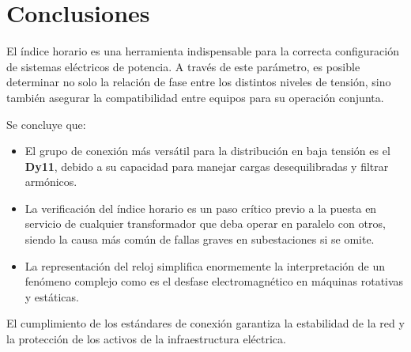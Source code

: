 \chapter{Conclusiones}

El índice horario es una herramienta indispensable para la correcta configuración 
de sistemas eléctricos de potencia. A través de este parámetro, es posible 
determinar no solo la relación de fase entre los distintos niveles de tensión, 
sino también asegurar la compatibilidad entre equipos para su operación conjunta.

Se concluye que:
\begin{itemize}
    \item El grupo de conexión más versátil para la distribución en baja tensión 
    es el \textbf{Dy11}, debido a su capacidad para manejar cargas desequilibradas 
    y filtrar armónicos.
    \item La verificación del índice horario es un paso crítico previo a la puesta 
    en servicio de cualquier transformador que deba operar en paralelo con otros, 
    siendo la causa más común de fallas graves en subestaciones si se omite.
    \item La representación del reloj simplifica enormemente la interpretación de 
    un fenómeno complejo como es el desfase electromagnético en máquinas 
    rotativas y estáticas.
\end{itemize}

El cumplimiento de los estándares de conexión garantiza la estabilidad de la red 
y la protección de los activos de la infraestructura eléctrica.
